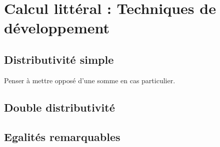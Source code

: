 \section{Calcul litt\'eral : Techniques de développement}
\subsection{Distributivité simple}

Penser à mettre opposé d'une somme en cas particulier.


\subsection{Double distributivité}


\subsection{Egalités remarquables}

